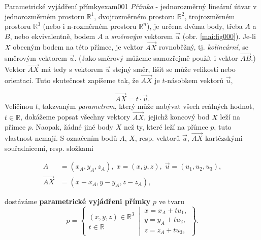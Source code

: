 \begin{mathexam}{Parametrické vyjádření přímky}{exam001}
  \emph{Přímka} - jednorozměrný lineární útvar v jednorozměrném prostoru \(\mathbb{R}^1\),
  dvojrozměrném prostoru \(\mathbb{R}^2\), trojrozměrném prostoru \(\mathbb{R}^3\) (nebo i
  n-rozměrném prostoru \(\mathbb{R}^n\)), je určena dvěma body, třeba \(A\) a \(B\), nebo
  ekvivalentně, bodem \(A\) a \emph{směrovým} vektorem \(\vec{u}\) (obr. \ref{mai:fig000}). Je-li
  \(X\) obecným bodem na této přímce, je vektor \(\overrightarrow{AX}\) rovnoběžný, tj.
  \emph{kolineární}, se směrovým vektorem \(\vec{u}\). (Jako směrový můžeme samozřejmě použít i
  vektor \(\overrightarrow{AB}\).) Vektor \(\overrightarrow{AX}\) má tedy s vektorem \(\vec{u}\)
  stejný směr, lišit se může velikostí nebo orientací. Tuto skutečnost zapíšeme tak, že
  \(\overrightarrow{AX}\) je \(t\)-násobkem vektorů \(\vec{u}\),
  
  \begin{equation*}
    \overrightarrow{AX} = t \cdot \vec{u}.
  \end{equation*}
  Veličinou \(t\), takzvaným \emph{parametrem}, který může nabývat všech reálných hodnot,
  \(t\in\mathbb{R}\), dokážeme popsat všechny vektory \(\overrightarrow{AX}\), jejichž koncový bod
  \(X\) leží na přímce \(p\). Naopak, žádné jiné body \(X\) než ty, které leží na přímce \(p\), tuto
  vlastnost nemají. S označením bodů \(A\), \(X\), resp. vektorů \(\vec{u}\),
  \(\overrightarrow{AX}\) kartézskými souřadnicemi, resp. složkami

  \begin{align*}
    A &= (x_A,y_A, z_A), \; x =(x,y,z),\; \vec{u} = (u_1,u_2,u_3),  \\ 
    \overrightarrow{AX} &= (x - x_A, y - y_A, z-z_A),
  \end{align*}

  { \centering
    \captionsetup{type=figure}
  \par}

  dostáváme \textbf{parametrické vyjádřeni přímky} \(p\) ve tvaru
  \begin{equation*}
    p = \left\{
      \begin{matrix}  
        (x,y,z)\in\mathbb{R}^3  \\
              t \in\mathbb{R}
      \end{matrix}
    \,\left\lvert\,
      \begin{matrix}
        x = x_A + tu_1,        \\
        y = y_A + tu_2,        \\
        z = z_A + tu_3,
      \end{matrix}\right.
    \right\}. 
  \end{equation*}
\end{mathexam}